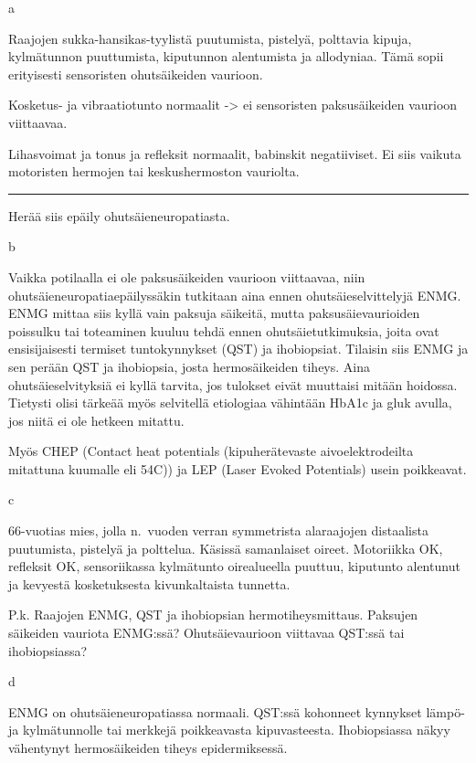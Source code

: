 \documentclass[
]{book}
\begin{document}
a

Raajojen sukka-hansikas-tyylistä puutumista, pistelyä, polttavia kipuja, kylmätunnon puuttumista, kiputunnon alentumista ja allodyniaa. Tämä sopii erityisesti sensoristen ohutsäikeiden vaurioon.

Kosketus- ja vibraatiotunto normaalit -\textgreater{} ei sensoristen paksusäikeiden vaurioon viittaavaa.

Lihasvoimat ja tonus ja refleksit normaalit, babinskit negatiiviset. Ei siis vaikuta motoristen hermojen tai keskushermoston vauriolta.

\begin{center}\rule{0.5\linewidth}{0.5pt}\end{center}

Herää siis epäily ohutsäieneuropatiasta.

b

Vaikka potilaalla ei ole paksusäikeiden vaurioon viittaavaa, niin ohutsäieneuropatiaepäilyssäkin tutkitaan aina ennen ohutsäieselvittelyjä ENMG. ENMG mittaa siis kyllä vain paksuja säikeitä, mutta paksusäievaurioiden poissulku tai toteaminen kuuluu tehdä ennen ohutsäietutkimuksia, joita ovat ensisijaisesti termiset tuntokynnykset (QST) ja ihobiopsiat. Tilaisin siis ENMG ja sen perään QST ja ihobiopsia, josta hermosäikeiden tiheys. Aina ohutsäieselvityksiä ei kyllä tarvita, jos tulokset eivät muuttaisi mitään hoidossa. Tietysti olisi tärkeää myös selvitellä etiologiaa vähintään HbA1c ja gluk avulla, jos niitä ei ole hetkeen mitattu.

Myös CHEP (Contact heat potentials (kipuherätevaste aivoelektrodeilta mitattuna kuumalle eli 54C)) ja LEP (Laser Evoked Potentials) usein poikkeavat.

c

66-vuotias mies, jolla n.~vuoden verran symmetrista alaraajojen distaalista puutumista, pistelyä ja polttelua. Käsissä samanlaiset oireet. Motoriikka OK, refleksit OK, sensoriikassa kylmätunto oirealueella puuttuu, kiputunto alentunut ja kevyestä kosketuksesta kivunkaltaista tunnetta.

P.k. Raajojen ENMG, QST ja ihobiopsian hermotiheysmittaus. Paksujen säikeiden vauriota ENMG:ssä? Ohutsäievaurioon viittavaa QST:ssä tai ihobiopsiassa?

d

ENMG on ohutsäieneuropatiassa normaali. QST:ssä kohonneet kynnykset lämpö- ja kylmätunnolle tai merkkejä poikkeavasta kipuvasteesta. Ihobiopsiassa näkyy vähentynyt hermosäikeiden tiheys epidermiksessä.
\end{document}
